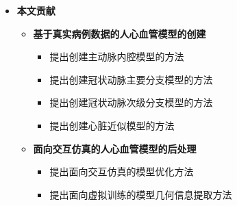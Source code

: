 \begin{frame}
\begin{itemize}
  \item \textbf{本文贡献}
  \begin{itemize}
     \item \textbf{基于真实病例数据的人心血管模型的创建}
    \begin{itemize}
       \item 提出创建主动脉内腔模型的方法
       \item 提出创建冠状动脉主要分支模型的方法
       \item 提出创建冠状动脉次级分支模型的方法
       \item 提出创建心脏近似模型的方法
    \end{itemize}
     \item \textbf{面向交互仿真的人心血管模型的后处理}
    \begin{itemize}
       \item 提出面向交互仿真的模型优化方法
       \item 提出面向虚拟训练的模型几何信息提取方法
    \end{itemize}
  \end{itemize}
\end{itemize}
\end{frame} 